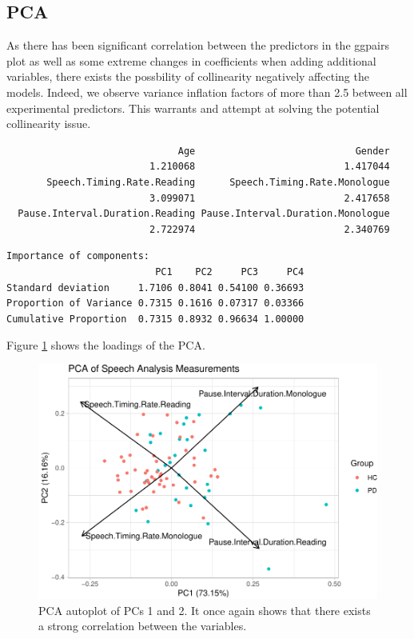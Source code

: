 \documentclass[
  english,
  doc,floatsintext]{apa6}
\begin{document}
\hypertarget{pca}{%
\subsection{PCA}\label{pca}}

As there has been significant correlation between the predictors in the ggpairs plot
as well as some extreme changes in coefficients when adding additional variables,
there exists the possbility of collinearity negatively affecting the models. Indeed,
we observe variance inflation factors of more than 2.5 between all experimental predictors.
This warrants and attempt at solving the potential collinearity issue.

\begin{verbatim}
                              Age                            Gender 
                         1.210068                          1.417044 
       Speech.Timing.Rate.Reading      Speech.Timing.Rate.Monologue 
                         3.099071                          2.417658 
  Pause.Interval.Duration.Reading Pause.Interval.Duration.Monologue 
                         2.722974                          2.340769 
\end{verbatim}

\begin{verbatim}
Importance of components:
                          PC1    PC2     PC3     PC4
Standard deviation     1.7106 0.8041 0.54100 0.36693
Proportion of Variance 0.7315 0.1616 0.07317 0.03366
Cumulative Proportion  0.7315 0.8932 0.96634 1.00000
\end{verbatim}

Figure \ref{fig:pca-loadings} shows the loadings of the PCA.

\begin{figure}

{\centering \includegraphics{dap_report_anja_probst_files/figure-latex/pca-loadings-1} 

}

\caption{PCA autoplot of PCs 1 and 2. It once again shows that there exists a strong correlation between the variables.}\label{fig:pca-loadings}
\end{figure}
\end{document}
